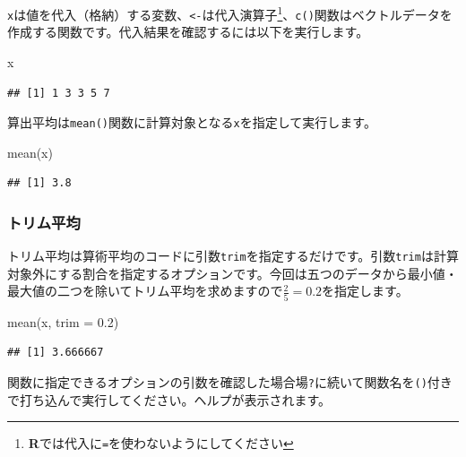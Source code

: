 \documentclass[
  12pt,
]{book}
\newenvironment{Shaded}{\begin{snugshade}}{\end{snugshade}}
\newcommand{\AttributeTok}[1]{\textcolor[rgb]{0.77,0.63,0.00}{#1}}
\newcommand{\FloatTok}[1]{\textcolor[rgb]{0.00,0.00,0.81}{#1}}
\newcommand{\FunctionTok}[1]{\textcolor[rgb]{0.00,0.00,0.00}{#1}}
\newcommand{\NormalTok}[1]{#1}
\begin{document}
\texttt{x}は値を代入（格納）する変数、\texttt{\textless{}-}は代入演算子\footnote{\textbf{R}では代入に\texttt{=}を使わないようにしてください}、\texttt{c()}関数はベクトルデータを作成する関数です。代入結果を確認するには以下を実行します。

\begin{Shaded}
\begin{Highlighting}[numbers=left,,]
\NormalTok{x}
\end{Highlighting}
\end{Shaded}

\begin{verbatim}
## [1] 1 3 3 5 7
\end{verbatim}

算出平均は\texttt{mean()}関数に計算対象となる\texttt{x}を指定して実行します。

\begin{Shaded}
\begin{Highlighting}[numbers=left,,]
\FunctionTok{mean}\NormalTok{(x)}
\end{Highlighting}
\end{Shaded}

\begin{verbatim}
## [1] 3.8
\end{verbatim}

\hypertarget{ux30c8ux30eaux30e0ux5e73ux5747}{%
\subsubsection{トリム平均}\label{ux30c8ux30eaux30e0ux5e73ux5747}}

トリム平均は算術平均のコードに引数\texttt{trim}を指定するだけです。引数\texttt{trim}は計算対象外にする割合を指定するオプションです。今回は五つのデータから最小値・最大値の二つを除いてトリム平均を求めますので\(\frac{2}{5} = 0.2\)を指定します。

\begin{Shaded}
\begin{Highlighting}[numbers=left,,]
\FunctionTok{mean}\NormalTok{(x, }\AttributeTok{trim =} \FloatTok{0.2}\NormalTok{)}
\end{Highlighting}
\end{Shaded}

\begin{verbatim}
## [1] 3.666667
\end{verbatim}

関数に指定できるオプションの引数を確認した場合場\texttt{?}に続いて関数名を\texttt{()}付きで打ち込んで実行してください。ヘルプが表示されます。
\end{document}
